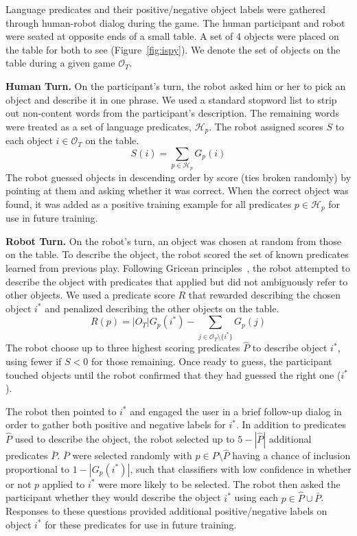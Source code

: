 Language predicates and their positive/negative object labels were gathered through human-robot dialog during the \ispy game.
The human participant and robot were seated at opposite ends of a small table.
A set of 4 objects were placed on the table for both to see (Figure~\ref{fig:ispy}).
We denote the set of objects on the table during a given game $\mathcal{O}_T$.

\textbf{Human Turn.} On the participant's turn, the robot asked him or her to pick an object and describe it in one phrase.
We used a standard stopword list to strip out non-content words from the participant's description.
The remaining words were treated as a set of language predicates, $\mathcal{H}_p$.
The robot assigned scores $S$ to each object $i\in \mathcal{O}_T$ on the table.
\begin{equation}
	S(i) = \sum_{p\in \mathcal{H}_p}{G_p(i)}
\end{equation}
The robot guessed objects in descending order by score (ties broken randomly) by pointing at them and asking whether it was correct.
When the correct object was found, it was added as a positive training example for all predicates $p\in \mathcal{H}_p$ for use in future training.

\textbf{Robot Turn.} On the robot's turn, an object was chosen at random from those on the table.
To describe the object, the robot scored the set of known predicates learned from previous play.
Following Gricean principles~\cite{grice:bkchapter75}, the robot attempted to describe the object with predicates that applied but did not ambiguously refer to other objects.
We used a predicate score $R$ that rewarded describing the chosen object $i^*$ and penalized describing the other objects on the table.
\begin{equation}
	R(p) = |O_T|G_p(i^*) - \sum_{j\in{\mathcal{O}_T}\setminus\{i^*\}}{G_p(j)}
\end{equation}
The robot choose up to three highest scoring predicates $\hat{P}$ to describe object $i^*$, using fewer if $S<0$ for those remaining.
Once ready to guess, the participant touched objects until the robot confirmed that they had guessed the right one ($i^*$).

The robot then pointed to $i^*$ and engaged the user in a brief follow-up dialog in order to gather both positive and negative labels for $i^*$.
In addition to predicates $\hat{P}$ used to describe the object, the robot selected up to $5-|\hat{P}|$ additional predicates $\bar{P}$.
$\bar{P}$ were selected randomly with $p\in P\setminus\hat{P}$ having a chance of inclusion proportional to $1-|G_p(i^*)|$, such that classifiers with low confidence in whether or not $p$ applied to $i^*$ were more likely to be selected.
The robot then asked the participant whether they would describe the object $i^*$ using each $p\in\hat{P}\cup\bar{P}$.
Responses to these questions provided additional positive/negative labels on object $i^*$ for these predicates for use in future training.
